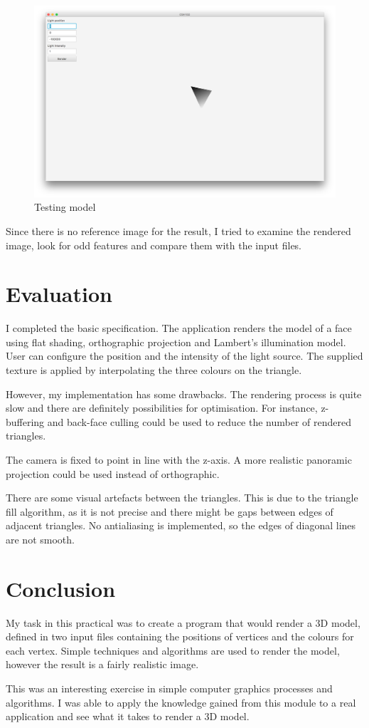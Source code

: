 \documentclass[]{article}
\begin{document}
\begin{figure}
  \includegraphics[width=\textwidth]{figures/triangle}
  \caption{Testing model}
  \label{fig:triangle}
\end{figure}

Since there is no reference image for the result, I tried to examine the rendered image, look for odd features and compare them with the input files.

\section{Evaluation}

I completed the basic specification. The application renders the model of a face using flat shading, orthographic projection and Lambert's illumination model. User can configure the position and the intensity of the light source. The supplied texture is applied by interpolating the three colours on the triangle.

However, my implementation has some drawbacks. The rendering process is quite slow and there are definitely possibilities for optimisation. For instance, z-buffering and back-face culling could be used to reduce the number of rendered triangles.

The camera is fixed to point in line with the z-axis. A more realistic panoramic projection could be used instead of orthographic.

There are some visual artefacts between the triangles. This is due to the triangle fill algorithm, as it is not precise and there might be gaps between edges of adjacent triangles. No antialiasing is implemented, so the edges of diagonal lines are not smooth.

\section{Conclusion}

My task in this practical was to create a program that would render a 3D model, defined in two input files containing the positions of vertices and the colours for each vertex. Simple techniques and algorithms are used to render the model, however the result is a fairly realistic image.

This was an interesting exercise in simple computer graphics processes and algorithms. I was able to apply the knowledge gained from this module to a real application and see what it takes to render a 3D model.
\end{document}
